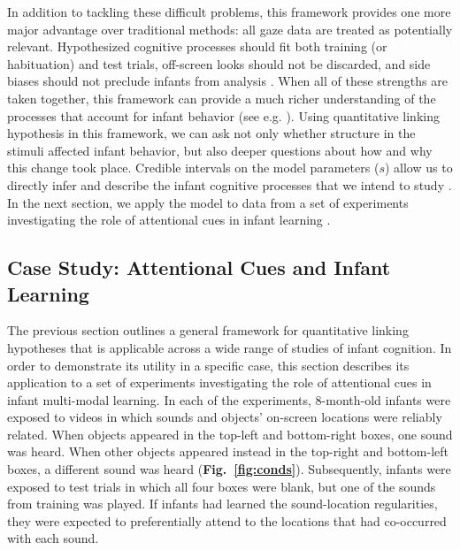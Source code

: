 \documentclass[12pt]{article}
\begin{document}
	In addition to tackling these difficult problems, this framework provides one more major advantage over traditional methods: all gaze data are treated as potentially relevant. Hypothesized cognitive processes should fit both training (or habituation) and test trials, off-screen looks should not be discarded, and side biases should not preclude infants from analysis \cite{Kelly2005, Farroni2005}. When all of these strengths are taken together, this framework can provide a much richer understanding of the processes that account for infant behavior (see e.g. \cite{Navarro2006, Lee2010a}). Using quantitative linking hypothesis in this framework, we can ask not only whether structure in the stimuli affected infant behavior, but also deeper questions about how and why this change took place. Credible intervals on the model parameters ($s$) allow us to directly infer and describe the infant cognitive processes that we intend to study \cite{Kruschke2010a}. In the next section, we apply the model to data from a set of experiments investigating the role of attentional cues in infant learning \cite{Wu2010a}.

\subsection*{Case Study: Attentional Cues and Infant Learning}

The previous section outlines a general framework for quantitative linking hypotheses that is applicable across a wide range of studies of infant cognition. In order to demonstrate its utility in a specific case, this section describes its application to a set of experiments investigating the role of attentional cues in infant multi-modal learning. In each of the experiments, 8-month-old infants were exposed to videos in which sounds and objects' on-screen locations were reliably related. When objects appeared in the top-left and bottom-right boxes, one sound was heard. When other objects appeared instead in the top-right and bottom-left boxes, a different sound was heard (\textbf{Fig.~\ref{fig:conds}}). Subsequently, infants were exposed to test trials in which all four boxes were blank, but one of the sounds from training was played. If infants had learned the sound-location regularities, they were expected to preferentially attend to the locations that had co-occurred with each sound.
\end{document}
